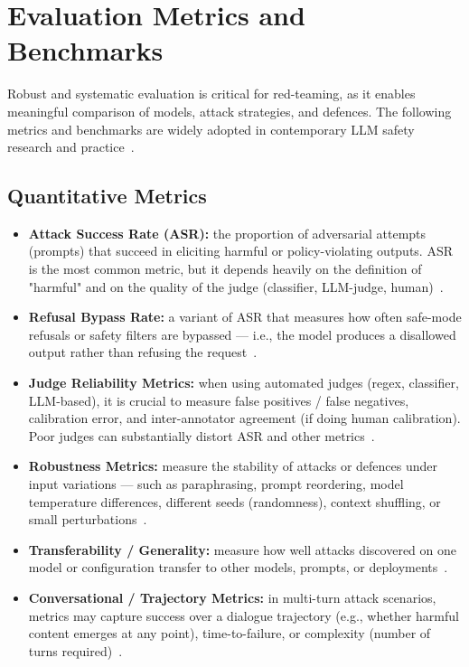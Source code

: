\section{Evaluation Metrics and Benchmarks}\label{sec:evaluation}

Robust and systematic evaluation is critical for red-teaming, as it enables meaningful comparison of models, attack strategies, and defences.
The following metrics and benchmarks are widely adopted in contemporary LLM safety research and practice~\cite{purpura2025building}.

\newpage{}

\subsection{Quantitative Metrics}\label{subsec:metrics-quant}

\begin{itemize}
  \item \textbf{Attack Success Rate (ASR):} the proportion of adversarial attempts (prompts) that succeed in eliciting harmful or policy-violating outputs. ASR is the most common metric, but it depends heavily on the definition of "harmful" and on the quality of the judge (classifier, LLM-judge, human)~\cite{wei2023jailbroken, mazeika2024harmbench, schoepf2025madmax}.  
  \item \textbf{Refusal Bypass Rate:} a variant of ASR that measures how often safe-mode refusals or safety filters are bypassed — i.e., the model produces a disallowed output rather than refusing the request~\cite{wei2023jailbroken, purpura2025building}.  
  \item \textbf{Judge Reliability Metrics:} when using automated judges (regex, classifier, LLM-based), it is crucial to measure false positives / false negatives, calibration error, and inter-annotator agreement (if doing human calibration). Poor judges can substantially distort ASR and other metrics~\cite{belaire2025automatic, purpura2025building}.  
  \item \textbf{Robustness Metrics:} measure the stability of attacks or defences under input variations — such as paraphrasing, prompt reordering, model temperature differences, different seeds (randomness), context shuffling, or small perturbations~\cite{mazeika2024harmbench, mehrotra2024tap}.  
  \item \textbf{Transferability / Generality:} measure how well attacks discovered on one model or configuration transfer to other models, prompts, or deployments~\cite{zou2023universal, mazeika2024harmbench}.  
  \item \textbf{Conversational / Trajectory Metrics:} in multi-turn attack scenarios, metrics may capture success over a dialogue trajectory (e.g., whether harmful content emerges at any point), time-to-failure, or complexity (number of turns required)~\cite{schoepf2025madmax, mehrotra2024tap}.  
\end{itemize}

